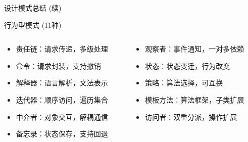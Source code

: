 \documentclass[UTF8,aspectratio=169]{beamer}
\begin{document}
\begin{frame}{设计模式总结 (续)}
    \begin{ytublock}{行为型模式 (11种)}
        \begin{columns}
            \begin{column}{0.5\textwidth}
                \begin{itemize}
                    \item 责任链：请求传递，多级处理
                    \item 命令：请求封装，支持撤销
                    \item 解释器：语言解析，文法表示
                    \item 迭代器：顺序访问，遍历集合
                    \item 中介者：对象交互，解耦通信
                    \item 备忘录：状态保存，支持回退
                \end{itemize}
            \end{column}
            \begin{column}{0.5\textwidth}
                \begin{itemize}
                    \item 观察者：事件通知，一对多依赖
                    \item 状态：状态变迁，行为改变
                    \item 策略：算法选择，可互换
                    \item 模板方法：算法框架，子类扩展
                    \item 访问者：双重分派，操作扩展
                \end{itemize}
            \end{column}
        \end{columns}
    \end{ytublock}
\end{frame}
\end{document}
